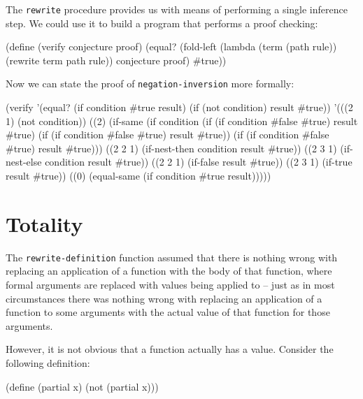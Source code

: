 The \texttt{rewrite} procedure provides us with means of performing
a single inference step. We could use it to build a program that
performs a proof checking:

\begin{Snippet}
  (define (verify conjecture proof)
    (equal? (fold-left (lambda (term (path rule))
                          (rewrite term path rule))
                       conjecture proof)
            #true))
\end{Snippet}

Now we can state the proof of \texttt{negation-inversion} more formally:

\begin{Snippet}
  (verify '(equal? (if condition #true result)
                   (if (not condition) result #true))
    '(((2 1)   (not condition))
      ((2)     (if-same (if condition
                            (if (if condition #false #true)
                                result
                                #true)
                            (if (if condition #false #true)
                                result
                                #true))
                        (if (if condition #false #true)
                            result
                            #true)))
      ((2 2 1) (if-nest-then condition result #true))
      ((2 3 1) (if-nest-else condition result #true))
      ((2 2 1) (if-false result #true))
      ((2 3 1) (if-true result #true))
      ((0)     (equal-same (if condition #true result)))))
\end{Snippet}

\section{Totality}

The \texttt{rewrite-definition} function assumed that there is nothing
wrong with replacing an application of a function with the body of that function,
where formal arguments are replaced with values being applied to -- just
as in most circumstances there was nothing wrong with replacing an application
of a function to some arguments with the actual value of that function for
those arguments.

However, it is not obvious that a function actually has a value.
Consider the following definition:

\begin{Snippet}
  (define (partial x)
    (not (partial x)))
\end{Snippet}

